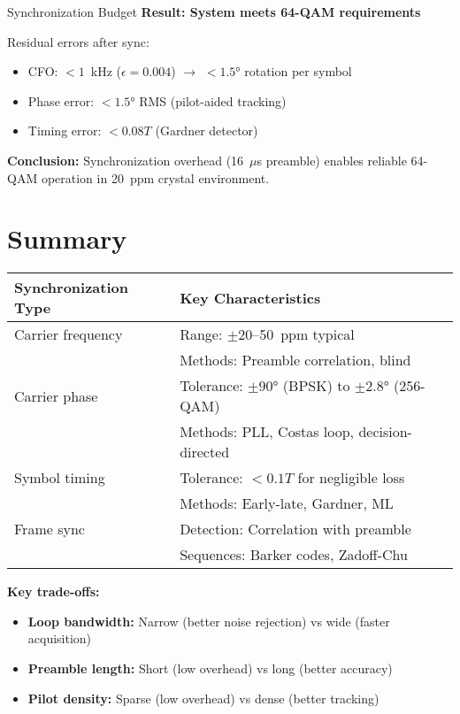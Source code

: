 \begin{calloutbox}[colback=black!8!white,colframe=black]{Synchronization Budget}
\textbf{Result: System meets 64-QAM requirements}

Residual errors after sync:
\begin{itemize}
\item CFO: $< 1$~kHz ($\epsilon = 0.004$) $\rightarrow$ $< 1.5°$ rotation per symbol
\item Phase error: $< 1.5°$ RMS (pilot-aided tracking)
\item Timing error: $< 0.08T$ (Gardner detector)
\end{itemize}

\textbf{Conclusion:} Synchronization overhead (16~$\mu$s preamble) enables reliable 64-QAM operation in 20~ppm crystal environment.
\end{calloutbox}

\section{Summary}

\begin{center}
\begin{tabular}{@{}ll@{}}
\toprule
\textbf{Synchronization Type} & \textbf{Key Characteristics} \\
\midrule
Carrier frequency & Range: $\pm 20$--50~ppm typical \\
                  & Methods: Preamble correlation, blind \\
Carrier phase     & Tolerance: $\pm 90°$ (BPSK) to $\pm 2.8°$ (256-QAM) \\
                  & Methods: PLL, Costas loop, decision-directed \\
Symbol timing     & Tolerance: $< 0.1T$ for negligible loss \\
                  & Methods: Early-late, Gardner, ML \\
Frame sync        & Detection: Correlation with preamble \\
                  & Sequences: Barker codes, Zadoff-Chu \\
\bottomrule
\end{tabular}
\end{center}

\textbf{Key trade-offs:}
\begin{itemize}
\item \textbf{Loop bandwidth:} Narrow (better noise rejection) vs wide (faster acquisition)
\item \textbf{Preamble length:} Short (low overhead) vs long (better accuracy)
\item \textbf{Pilot density:} Sparse (low overhead) vs dense (better tracking)
\end{itemize}

